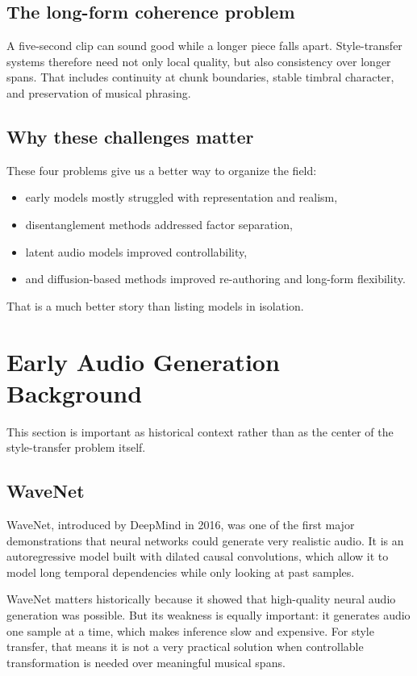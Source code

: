 \documentclass[11pt]{article}
\begin{document}
\subsection{The long-form coherence problem}

A five-second clip can sound good while a longer piece falls apart. Style-transfer systems therefore need not only local quality, but also consistency over longer spans. That includes continuity at chunk boundaries, stable timbral character, and preservation of musical phrasing.

\subsection{Why these challenges matter}

These four problems give us a better way to organize the field:

\begin{itemize}
\item early models mostly struggled with representation and realism,
\item disentanglement methods addressed factor separation,
\item latent audio models improved controllability,
\item and diffusion-based methods improved re-authoring and long-form flexibility.
\end{itemize}

That is a much better story than listing models in isolation.

\section{Early Audio Generation Background}

This section is important as historical context rather than as the center of the style-transfer problem itself.

\subsection{WaveNet}

WaveNet, introduced by DeepMind in 2016, was one of the first major demonstrations that neural networks could generate very realistic audio. It is an autoregressive model built with dilated causal convolutions, which allow it to model long temporal dependencies while only looking at past samples.

WaveNet matters historically because it showed that high-quality neural audio generation was possible. But its weakness is equally important: it generates audio one sample at a time, which makes inference slow and expensive. For style transfer, that means it is not a very practical solution when controllable transformation is needed over meaningful musical spans.
\end{document}
